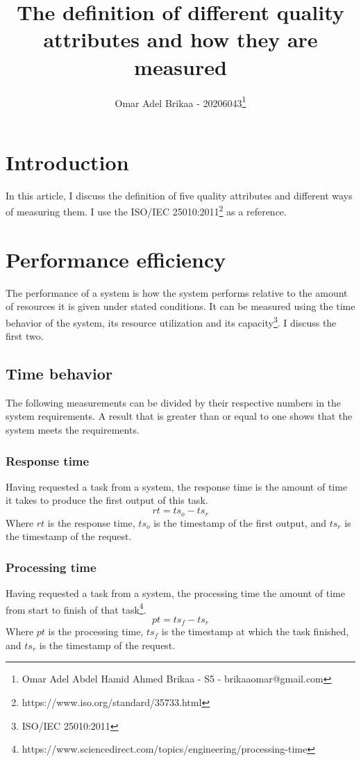 \documentclass[11pt,a4paper]{article}
\def \iso{\footnote{ISO/IEC 25010:2011}}
\begin{document}
\title{The definition of different quality attributes and how they are measured}
\author{Omar Adel Brikaa - 20206043\thanks{Omar Adel Abdel Hamid Ahmed Brikaa - S5 - brikaaomar@gmail.com}}
\date{}
\maketitle

\tableofcontents

\section{Introduction}
In this article, I discuss the definition of five quality attributes and different ways of measuring them. I use the
ISO/IEC 25010:2011\footnote{\label{iso}https://www.iso.org/standard/35733.html} as a reference.

\section{Performance efficiency}
The performance of a system is how the system performs relative to the amount of resources it is given
under stated conditions. It can be measured using the time behavior of the system, its resource utilization and its
capacity\iso. I discuss the first two.

\subsection{Time behavior}
The following measurements can be divided by their respective numbers in the system requirements. A result that is greater
than or equal to one shows that the system meets the requirements.

\subsubsection{Response time}
Having requested a task from a system, the response time is the amount of time it takes
to produce the first output of this task.
\[rt = ts_o - ts_r\]
Where $rt$ is the response time, $ts_o$ is the timestamp of the first output, and $ts_r$ is the timestamp of the request.

\subsubsection{Processing time}
Having requested a task from a system, the processing time the amount of time from start to finish of that
task\footnote{https://www.sciencedirect.com/topics/engineering/processing-time}.
\[pt = ts_f - ts_r\]
Where $pt$ is the processing time, $ts_f$ is the timestamp at which the task finished,
and $ts_r$ is the timestamp of the request.
\end{document}
